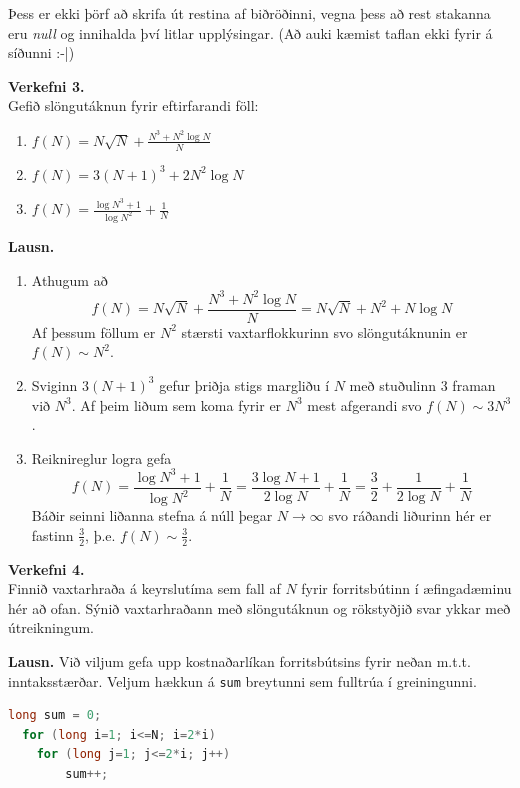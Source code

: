 \documentclass[a4paper, 12pt]{article}
\begin{document}
\noindent
Þess er ekki þörf að skrifa út restina af biðröðinni, vegna þess að rest stakanna eru \textit{null} og innihalda því litlar
upplýsingar. (Að auki kæmist taflan ekki fyrir á síðunni :-|)

\newpage
\noindent
\textbf{Verkefni 3.} \\
Gefið slöngutáknun fyrir eftirfarandi föll:
\begin{enumerate}[label=(\alph*)]
  \item $f(N) = N \sqrt N + \frac{N^3 + N^2 \log N}{N}$
  \item $f(N) = 3(N + 1)^3 + 2N^2 \log N$
  \item $f(N) = \frac{\log N^3 + 1}{\log N^2} + \frac 1N$
\end{enumerate}

\noindent
\textbf{Lausn.}
\begin{enumerate}[label=(\alph*)]
  \item Athugum að
  \[
    f(N) = N \sqrt N + \frac{N^3 + N^2 \log N}{N} = N \sqrt N + N^2 + N \log N
  \]
  Af þessum föllum er $N^2$ stærsti vaxtarflokkurinn svo slöngutáknunin er $f(N) \sim N^2$.

  \item Sviginn $3(N + 1)^3$ gefur þriðja stigs margliðu í $N$ með stuðulinn $3$ framan við $N^3$.
    Af þeim liðum sem koma fyrir er $N^3$ mest afgerandi svo $f(N) \sim 3N^3$.

  \item Reiknireglur logra gefa
   \[
     f(N) = \frac{\log N^3 + 1}{\log N^2} + \frac 1N = \frac{3 \log N + 1}{2 \log N} + \frac 1N = \frac 32 + \frac{1}{2 \log N} + \frac 1N
   \]
  Báðir seinni liðanna stefna á núll þegar $N \to \infty$ svo ráðandi liðurinn hér er fastinn $\frac 32$, þ.e. $f(N) \sim \frac 32$.
\end{enumerate}

\newpage
\noindent
\textbf{Verkefni 4.} \\
Finnið vaxtarhraða á keyrslutíma sem fall af $N$ fyrir forritsbútinn í æfingadæminu hér að ofan. Sýnið vaxtarhraðann með slöngutáknun og rökstyðjið
svar ykkar með útreikningum.

\medskip
\noindent
\textbf{Lausn.} Við viljum gefa upp kostnaðarlíkan forritsbútsins fyrir neðan m.t.t. inntaksstærðar. Veljum hækkun á \texttt{sum} breytunni sem fulltrúa
í greiningunni. 

\begin{lstlisting}[language=java]
 long sum = 0;
  for (long i=1; i<=N; i=2*i)
    for (long j=1; j<=2*i; j++)
        sum++; 
\end{lstlisting}
\end{document}
